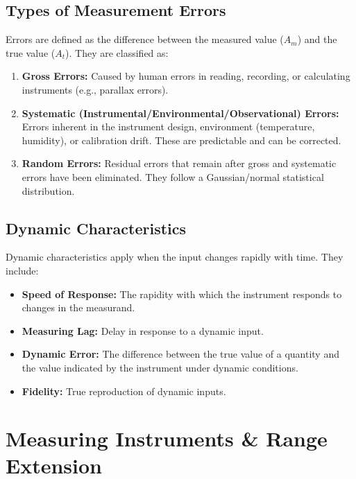 \documentclass[12pt,a4paper]{article}
\begin{document}
\subsection{Types of Measurement Errors}
Errors are defined as the difference between the measured value ($A_m$) and the true value ($A_t$). They are classified as:
\begin{enumerate}[label=\alph*., leftmargin=*]
  \item \textbf{Gross Errors:} Caused by human errors in reading, recording, or calculating instruments (e.g., parallax errors).
  \item \textbf{Systematic (Instrumental/Environmental/Observational) Errors:} Errors inherent in the instrument design, environment (temperature, humidity), or calibration drift. These are predictable and can be corrected.
  \item \textbf{Random Errors:} Residual errors that remain after gross and systematic errors have been eliminated. They follow a Gaussian/normal statistical distribution.
\end{enumerate}

\subsection{Dynamic Characteristics}
Dynamic characteristics apply when the input changes rapidly with time. They include:
\begin{itemize}[leftmargin=*, itemsep=2.5pt]
  \item \textbf{Speed of Response:} The rapidity with which the instrument responds to changes in the measurand.
  \item \textbf{Measuring Lag:} Delay in response to a dynamic input.
  \item \textbf{Dynamic Error:} The difference between the true value of a quantity and the value indicated by the instrument under dynamic conditions.
  \item \textbf{Fidelity:} True reproduction of dynamic inputs.
\end{itemize}

\section{Measuring Instruments \& Range Extension}
\end{document}
